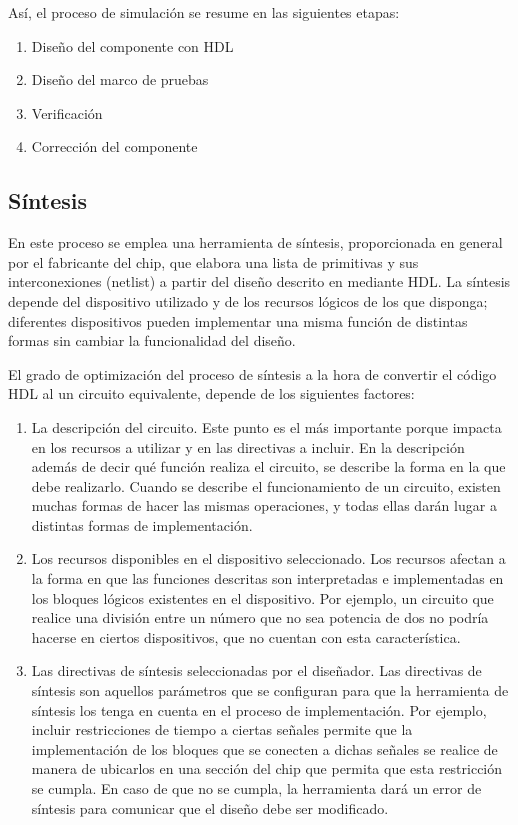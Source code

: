 Así, el proceso de simulación se resume en las siguientes etapas:

\begin{enumerate}
\item
Diseño del componente con HDL
\item
Diseño del marco de pruebas
\item
Verificación
\item
Corrección del componente
\end{enumerate}


\subsection{Síntesis}

En este proceso se emplea una herramienta de síntesis, proporcionada en general por el fabricante del chip, que elabora una lista de primitivas y sus interconexiones (netlist) a partir del diseño descrito en mediante HDL. La síntesis depende del dispositivo utilizado y de los recursos lógicos de los que disponga; diferentes dispositivos pueden implementar una misma función de distintas formas sin cambiar la funcionalidad del diseño. 

El grado de optimización del proceso de síntesis a la hora de convertir el código HDL al un circuito equivalente, depende de los siguientes factores:
\begin{enumerate}
\item La descripción del circuito.
Este punto es el más importante porque impacta en los recursos a utilizar y en las directivas a incluir. En la descripción además de decir qué función realiza el circuito, se describe la forma en la que debe realizarlo. Cuando se describe el funcionamiento de un circuito, existen muchas formas de hacer las mismas operaciones, y todas ellas darán lugar a distintas formas de implementación.

\item Los recursos disponibles en el dispositivo seleccionado.
Los recursos afectan a la forma en que las funciones descritas son interpretadas e implementadas en los bloques lógicos existentes en el dispositivo. Por ejemplo, un circuito que realice una división entre un número que no sea potencia de dos no podría hacerse en ciertos dispositivos, que no cuentan con esta característica.

\item Las directivas de síntesis seleccionadas por el diseñador.
Las directivas de síntesis son aquellos parámetros que se configuran para que la herramienta de síntesis los tenga en cuenta en el proceso de implementación. Por ejemplo, incluir restricciones de tiempo a ciertas señales permite que la implementación de los bloques que se conecten a dichas señales se realice de manera de ubicarlos en una sección del chip que permita que esta restricción se cumpla. En caso de que no se cumpla, la herramienta dará un error de síntesis para comunicar que el diseño debe ser modificado.
\end{enumerate}



